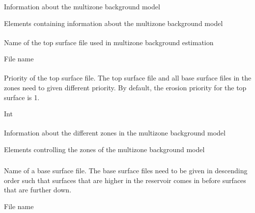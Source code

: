 \subsubsection{}
 \slist
   \item \Description  Information about the multizone background model
   \item \Argument Elements containing information about the multizone background model
   \item \Default
 \elist

\paragraph{}
 \slist
   \item \Description Name of the top surface file used in multizone background estimation
   \item \Argument File name
   \item \Default
 \elist

\paragraph{}
 \slist
   \item \Description Priority of the top surface file. The top surface file and all base surface files in the zones need to given different priority. By default, the erosion priority for the top surface is 1.
   \item \Argument Int
   \item {}
 \elist

\paragraph{}
 \slist
   \item \Description Information about the different zones in the multizone background model
   \item \Argument Elements controlling the zones of the multizone background model
   \item \Default
 \elist

\subparagraph{}
 \slist
   \item \Description Name of a base surface file. The base surface files need to be given in descending order such that surfaces that are higher in the reservoir comes in before surfaces that are further down.
   \item \Argument File name
   \item \Default
 \elist

